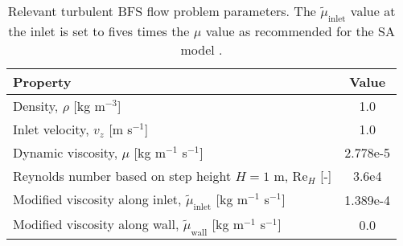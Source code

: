 \begin{table}[htb]
  \centering
  \small
  \caption{Relevant turbulent \gls{BFS} flow problem parameters. The $\tilde{\mu}_\text{inlet}$ value
  at the inlet is set to fives times the $\mu$ value as recommended for the \gls{SA} model
  \cite{spalart_one-equation_1994}.}
  \begin{tabular}{l S}
    \toprule
    Property & {Value} \\
    \midrule
    Density, $\rho$ [kg m$^{-3}$] & 1.0 \\
    Inlet velocity, $v_z$ [m s$^{-1}$] & 1.0 \\
    Dynamic viscosity, $\mu$ [kg m$^{-1}$ s$^{-1}$] & 2.778e-5 \\
    Reynolds number based on step height $H=1$ m, Re$_H$ [-] & 3.6e4 \\
    Modified viscosity along inlet, $\tilde{\mu}_\text{inlet}$ [kg m$^{-1}$ s$^{-1}$] & 1.389e-4 \\
    Modified viscosity along wall, $\tilde{\mu}_\text{wall}$ [kg m$^{-1}$ s$^{-1}$] & 0.0 \\
    \bottomrule
  \end{tabular}
  \label{table:bfs}
\end{table}


